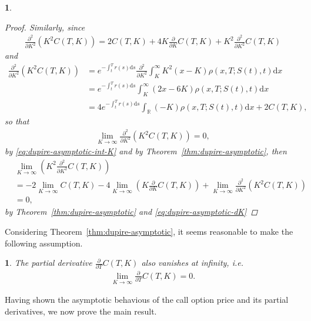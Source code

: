 \documentclass[english]{article}
\numberwithin{equation}{section}
\numberwithin{figure}{section}
\theoremstyle{bolddescit}
\theoremstyle{definition}
\theoremstyle{definition}
\theoremstyle{plain}
\newtheorem{lemma}[theorem]{\protect\lemmaname}
\theoremstyle{plain}
\theoremstyle{bolddesc}
\newtheorem{assumption}[theorem]{\protect\assumptionname}
\theoremstyle{plain}
\theoremstyle{remark}
\providecommand{\assumptionname}{Assumption}
\providecommand{\lemmaname}{Lemma}
\begin{document}
\begin{lemma}
\begin{proof}
    Similarly, since
    \begin{align*}
      \frac{\partial^2}{\partial K^2} (K^2 C(T,K))
      = 2C(T,K) + 4K \frac{\partial}{\partial K} C(T,K) + K^2 \frac{\partial^2}{\partial K^2} C(T,K)
    \end{align*}
    and
    \begin{align*}
      \frac{\partial^2}{\partial K^2} (K^2 C(T,K))
      &= e^{-\int_t^T r(s)\mathrm{d}s} \frac{\partial^2}{\partial K^2} \int_K^\infty K^2 (x-K) \rho(x,T;S(t),t) \mathrm{d}x\\
      &= e^{-\int_t^T r(s)\mathrm{d}s} \int_K^\infty (2x-6K) \rho(x,T;S(t),t) \mathrm{d}x\\
      &= 4 e^{-\int_t^T r(s)\mathrm{d}s} \int_\mathbb{R} (-K) \rho(x,T;S(t),t) \mathrm{d}x + 2 C(T,K),
    \end{align*}
    so that
    \begin{align*}
      \lim_{K \to \infty} \frac{\partial^2}{\partial K^2} (K^2 C(T,K)) = 0,
    \end{align*}
    by \eqref{eq:dupire-asymptotic-int-K} and by Theorem~\ref{thm:dupire-asymptotic}, then
    \begin{align*}
      &\lim_{K \to \infty} \left(K^2 \frac{\partial^2}{\partial K^2} C(T,K)\right)\\
      &= - 2\lim_{K \to \infty} C(T,K)
        - 4 \lim_{K \to \infty} \left(K \frac{\partial}{\partial K} C(T,K)\right)
        + \lim_{K \to \infty} \frac{\partial^2}{\partial K^2} (K^2 C(T,K))\\
      &= 0,
    \end{align*}
    by Theorem~\ref{thm:dupire-asymptotic} and \eqref{eq:dupire-asymptotic-dK}
  \end{proof}
\end{lemma}

Considering Theorem~\ref{thm:dupire-asymptotic}, it seems reasonable to make the following assumption.

\begin{assumption}\label{ass:dupire-asymptotic-dT}
  The partial derivative $\frac{\partial}{\partial T} C(T,K)$ also vanishes at infinity, i.e.
  \begin{align*}
    \lim_{K \to \infty} \frac{\partial}{\partial T} C(T,K) = 0.
  \end{align*}
\end{assumption}

Having shown the asymptotic behavious of the call option price and its partial derivatives, we now prove the main result.
\end{document}
